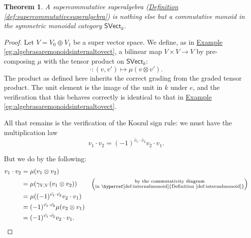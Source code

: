 \documentclass[a4paper]{report}
\theoremstyle{definition}
\theoremstyle{plain}
\newtheorem{theorem}{Theorem}[section]
\theoremstyle{remark}
\begin{document}
\begin{theorem}
  A supercommutative superalgebra (\hyperref[def:supercommutativesuperalgebra]{Definition \ref*{def:supercommutativesuperalgebra}}) is nothing else but a commutative monoid in the symmetric monoidal category $\mathsf{SVect}_{k}$.
\end{theorem}
\begin{proof}
  Let $V = V_{0} \oplus V_{1}$ be a super vector space. We define, as in \hyperref[eg:algebrasaremonoidsinternaltovect]{Example \ref*{eg:algebrasaremonoidsinternaltovect}}, a bilinear map $V \times V \to V$ by pre-composing $\mu$ with the tensor product on $\mathsf{SVect}_{k}$:
  \begin{equation*}
    \cdot\colon (v, v') \mapsto \mu(v \otimes v').
  \end{equation*}
  The product as defined here inherits the correct grading from the graded tensor product. The unit element is the image of the unit in $k$ under $e$, and the verification that this behaves correctly is identical to that in \hyperref[eg:algebrasaremonoidsinternaltovect]{Example \ref*{eg:algebrasaremonoidsinternaltovect}}.

  All that remains is the verification of the Koszul sign rule: we must have the multiplication law
  \begin{equation*}
    v_{1} \cdot v_{2} = (-1)^{\tilde{v_{1}} \cdot \tilde{v_{2}}} v_{2} \cdot v_{1}.
  \end{equation*}

  But we do by the following:
  \begin{align*}
    v_{1} \cdot v_{2} &= \mu(v_{1} \otimes v_{2}) \\
    &= \mu(\gamma_{V, V}(v_{1} \otimes v_{2})) &\left( \substack{\text{by the commutativity diagram}\\ \text{in \hyperref[def:internalmonoid]{Definition \ref*{def:internalmonoid}}}} \right)\\ 
    &= \mu((-1)^{\tilde{v_{1}} \cdot \tilde{v_{2}}} v_{2} \cdot v_{1}) \\
    &= (-1)^{\tilde{v_{1}} \cdot \tilde{v_{2}}} \mu(v_{2} \otimes v_{1}) \\
    &= (-1)^{\tilde{v_{1}} \cdot \tilde{v_{2}}} v_{2} \cdot v_{1}.
  \end{align*}
\end{proof} 
\end{document}
